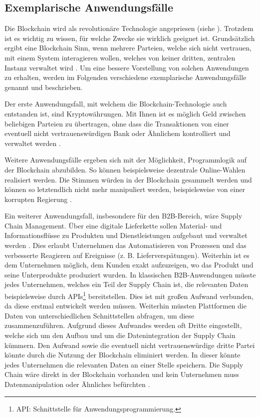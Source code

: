 \subsection{Exemplarische Anwendungsfälle}
\label{subsec:use-cases}
Die Blockchain wird als revolutionäre Technologie angepriesen (siehe \cite{TapscottBlockchainRevolutionWieTechnologie2016}). Trotzdem ist es wichtig zu wissen, für welche Zwecke sie wirklich geeignet ist. Grundsätzlich ergibt eine Blockchain Sinn, wenn mehrere Parteien, welche sich nicht vertrauen, mit einem System interagieren wollen, welches von keiner dritten, zentralen Instanz verwaltet wird \cite{WustyouneedBlockchain2017}. Um eine bessere Vorstellung von solchen Anwendungen zu erhalten, werden im Folgenden verschiedene exemplarische Anwendungsfälle genannt und beschrieben.

Der erste Anwendungsfall, mit welchem die Blockchain-Technologie auch entstanden ist, sind Kryptowährungen. Mit Ihnen ist es möglich Geld zwischen beliebigen Parteien zu übertragen, ohne dass die Transaktionen von einer eventuell nicht vertrauenswürdigen Bank oder Ähnlichem kontrolliert und verwaltet werden \cite[S.~\Rn{10}]{SwanBlockchainblueprintnew2015}.

Weitere Anwendungsfälle ergeben sich mit der Möglichkeit, Programmlogik auf der Blockchain abzubilden. So können beispielsweise dezentrale Online-Wahlen realisiert werden. Die Stimmen würden in der Blockchain gesammelt werden und können so letztendlich nicht mehr manipuliert werden, beispielsweise von einer korrupten Regierung \cite{CastorEthereumVotingScheme2017}. 

Ein weiterer Anwendungsfall, insbesondere für den B2B-Bereich, wäre Supply Chain Management. Über eine digitale Lieferkette sollen Material- und Informationsflüsse zu Produkten und Dienstleistungen aufgebaut und verwaltet werden \cite{KriegerSupplyChainManagement}. Dies erlaubt Unternehmen das Automatisieren von Prozessen und das verbesserte Reagieren auf Ereignisse (z. B. Lieferverspätungen). Weiterhin ist es dem Unternehmen möglich, dem Kunden exakt aufzuzeigen, wo das Produkt und seine Unterprodukte produziert wurden. In klassischen B2B-Anwendungen müsste jedes Unternehmen, welches ein Teil der Supply Chain ist, die relevanten Daten beispielsweise durch APIs\footnote{API: Schnittstelle für Anwendungsprogrammierung\cite{DigHowAPIsevolve2006}.} bereitstellen. Dies ist mit großen Aufwand verbunden, da diese erstmal entwickelt werden müssen. Weiterhin müssten Plattformen die Daten von unterschiedlichen Schnittstellen abfragen, um diese zusammenzuführen. Aufgrund dieses Aufwandes werden oft Dritte eingestellt, welche sich um den Aufbau und um die Datenintegration der Supply Chain kümmern. Den Aufwand sowie die eventuell nicht vertrauenswürdige dritte Partei könnte durch die Nutzung der Blockchain eliminiert werden. In dieser könnte jedes Unternehmen die relevanten Daten an einer Stelle speichern. Die Supply Chain wäre direkt in der Blockchain vorhanden und kein Unternehmen muss Datenmanipulation oder Ähnliches befürchten \cite{KorpelaDigitalSupplyChain2017}.

